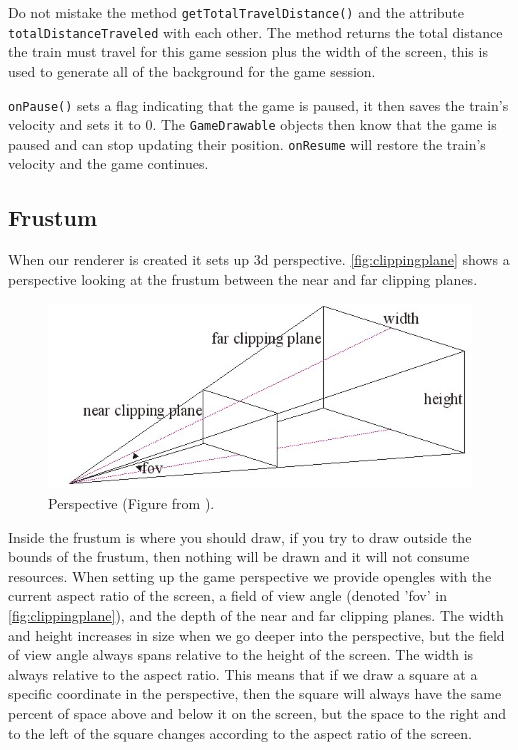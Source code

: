 \begin{description}
Do not mistake the method \lstinline|getTotalTravelDistance()| and the attribute \lstinline|totalDistanceTraveled| with each other. The method returns the total distance the train must travel for this game session plus the width of the screen, this is used to generate all of the background for the game session.

\lstinline|onPause()| sets a flag indicating that the game is paused, it then saves the train's velocity and sets it to 0. The \lstinline|GameDrawable| objects then know that the game is paused and can stop updating their position. \lstinline|onResume| will restore the train's velocity and the game continues.

\end{description}

\subsection{Frustum}\label{sec:frustum}

When our renderer is created it sets up \ac{3d} perspective. \autoref{fig:clippingplane} shows a perspective looking at the frustum between the near and far clipping planes.
\begin{figure}[H]
\centering
\includegraphics[width=0.9\linewidth]{img/clippingplane.jpg}
\caption{Perspective (Figure from \citep{clippingplane}).}
\label{fig:clippingplane}
\end{figure}
Inside the frustum is where you should draw, if you try to draw outside the bounds of the frustum, then nothing will be drawn and it will not consume resources. When setting up the game perspective we provide \ac{opengles} with the current aspect ratio of the screen, a field of view angle (denoted 'fov' in \autoref{fig:clippingplane}), and the depth of the near and far clipping planes. The width and height increases in size when we go deeper into the perspective, but the field of view angle always spans relative to the height of the screen. The width is always relative to the aspect ratio. This means that if we draw a square at a specific coordinate in the perspective, then the square will always have the same percent of space above and below it on the screen, but the space to the right and to the left of the square changes according to the aspect ratio of the screen.


